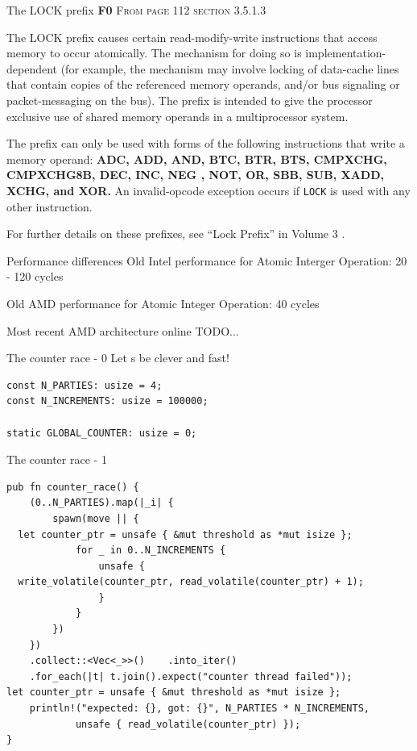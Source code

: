 \documentclass[10pt,aspectratio=169]{beamer}
\begin{document}
\begin{frame}{The LOCK prefix \textbf{F0}}
    \textsc{From page 112 section 3.5.1.3 \cite{AMD64ArchVol1}}

    The LOCK prefix causes certain
read-modify-write instructions that access memory to occur atomically.
The mechanism for doing so is \alert{implementation-dependent} (for example, the mechanism
may involve \alert{locking} of \alert{data-cache lines} that contain copies of
the referenced memory operands, and/or \alert{bus signaling} or packet-messaging on the bus).
The prefix is intended to give the processor exclusive use of shared memory
operands in a multiprocessor system.

The prefix can only be used with forms of the following instructions that write a memory operand:
\textbf{ADC, ADD, AND, BTC, BTR, BTS, CMPXCHG, CMPXCHG8B, DEC, INC, NEG
, NOT, OR, SBB, SUB, XADD, XCHG, and XOR.}
An invalid-opcode exception occurs if
\texttt{LOCK} is used with any other instruction.

For further details on these prefixes, see “Lock Prefix” in Volume 3 \cite{AMD64ArchVol3}.
\end{frame}

\begin{frame}{Performance differences}
    Old Intel performance for Atomic Interger Operation: 20 - 120 cycles

    Old AMD performance for Atomic Integer Operation: 40  cycles

    Most recent AMD architecture\cite{AMD64ArchVol1} online TODO...
\end{frame}


\begin{frame}[fragile]{The counter race - 0}
Let s be clever and fast!
\begin{verbatim}
const N_PARTIES: usize = 4;
const N_INCREMENTS: usize = 100000;

static GLOBAL_COUNTER: usize = 0;
\end{verbatim}
\end{frame}

\begin{frame}[fragile]{The counter race - 1}
\begin{verbatim}
pub fn counter_race() {
    (0..N_PARTIES).map(|_i| {
        spawn(move || {
  let counter_ptr = unsafe { &mut threshold as *mut isize };
            for _ in 0..N_INCREMENTS {
                unsafe {
  write_volatile(counter_ptr, read_volatile(counter_ptr) + 1);
                }
            }
        })
    })
    .collect::<Vec<_>>()    .into_iter()
    .for_each(|t| t.join().expect("counter thread failed"));
let counter_ptr = unsafe { &mut threshold as *mut isize };
    println!("expected: {}, got: {}", N_PARTIES * N_INCREMENTS,
            unsafe { read_volatile(counter_ptr) });
}
\end{verbatim}
\end{frame}
\end{document}

